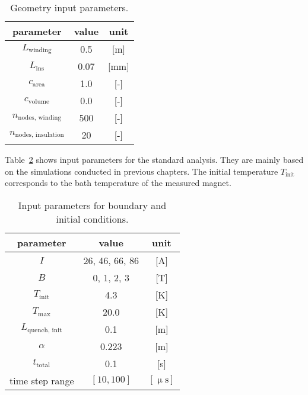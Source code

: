 \begin{table}[H]
    \caption{Geometry input parameters.} 
    \vspace{-1.em} 
    \fontsize{10}{10}
    \selectfont 
    \renewcommand{\arraystretch}{1.5}
    \begin{center}
        \begin{tabular}{ ccc }  
        \hline
        parameter & value & unit \\
        \hline
        $L_\text{winding}$ & 0.5 & [m] \\ 
        $L_\text{ins}$ & 0.07 & [mm] \\
        $c_\text{area}$ & 1.0 & [-] \\
        $c_\text{volume}$ & 0.0 & [-] \\
        $n_\text{nodes, winding}$ & 500 & [-] \\ 
        $n_\text{nodes, insulation}$ & 20 & [-] \\
        \hline 
        \end{tabular}
    \end{center}  
     \label{table: quench_velocity_map_input_parameters_geometry} 
 \end{table}

Table~\ref{table: quench_velocity_map_input_parameters} shows input parameters for the standard analysis. They are mainly based on the simulations conducted in previous chapters. The initial temperature $T_\text{init}$ corresponds to the bath temperature of the measured magnet.

\begin{table}[H]
    \caption{Input parameters for boundary and initial conditions.} 
    \vspace{-1.em} 
    \fontsize{10}{10}
    \selectfont 
    \renewcommand{\arraystretch}{1.5}
    \begin{center}
        \begin{tabular}{ ccc }  
        \hline
        parameter & value & unit \\
        \hline
        $I$ & 26, 46, 66, 86 & [A] \\
        $B$ & 0, 1, 2, 3 & [T] \\
        $T_\text{init}$ & 4.3 & [K] \\
        $T_\text{max}$ & 20.0 & [K] \\
        $L_\text{quench, init}$ & 0.1 & [m] \\ 
        $\alpha$ & 0.223 & [m] \\   
        $t_\text{total}$ & 0.1 & [s] \\
        time step range & $[10, 100]$ & $[\upmu \text{s}]$ \\
        \hline 
        \end{tabular}
    \end{center}  
     \label{table: quench_velocity_map_input_parameters} 
 \end{table}

